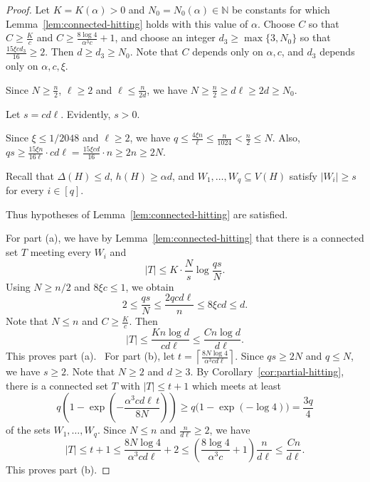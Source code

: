 \documentclass[11pt,a4paper]{article}
\theoremstyle{definition}
\theoremstyle{remark}
\newcommand{\N}{\mathbb N}
\begin{document}
\begin{proof}
Let $K=K(\alpha)>0$ and
$N_0=N_0(\alpha)\in\N$ be constants for which
Lemma~\ref{lem:connected-hitting} holds with this value of $\alpha$.
Choose $C$ so that
$C\ge \frac{K}{c}$ and $C\ge \frac{8\log4}{\alpha^3c}+1$, and choose an integer
$d_3\ge\max\{3,N_0\}$ so that $\frac{15\xi cd_3}{16}\ge2$. Then $d\ge d_3\ge N_0$. 
Note that $C$ depends only on $\alpha,c$, and $d_3$ depends only on
$\alpha,c,\xi$.


Since $N\ge \frac{n}{2}$, $\ell\ge2$ and $\ell\le \frac{n}{2d}$, we have
$N\ge \frac{n}{2}\ge d\ell\ge 2d\ge N_0$.


Let $s=cd\ell$. Evidently, $s>0$.

Since $\xi\le1/2048$ and $\ell\ge2$, we have $q\le \frac{4\xi n}{\ell}\le \frac{n}{1024}<\frac{n}{2}\le N$. Also, 
$qs\ge\frac{15\xi n}{16\ell}\cdot cd\ell
     =\frac{15\xi cd}{16}\cdot n
     \ge2n\ge2N$.

Recall that  $\Delta(H)\le d$,  $h(H)\ge\alpha d$, and 
$W_1,\ldots,W_q\subseteq V(H)$ satisfy $|W_i|\ge s$ for
every $i\in[q]$.

Thus hypotheses of Lemma~\ref{lem:connected-hitting} are satisfied.  


For part \textup{(a)}, we have by   Lemma~\ref{lem:connected-hitting} that there is  a connected set $T$
meeting every $W_i$ and 
\[
|T|\le K\cdot \frac{N}{s}\log \frac{qs}{N}.
\] 
Using $N\ge n/2$ and $8\xi c\le1$, we obtain
\[
 2\le\frac{qs}{N}
   \le\frac{2qcd\ell}{n}
   \le8\xi cd\le d.
\]
Note that  $N\le n$ and $C\ge \frac{K}{c}$. Then 
\[
 |T|\le\frac{Kn\log d}{cd\ell}
      \le\frac{Cn\log d}{d\ell}.
\]
This proves part (a).
\
For part (b), let
$t=\left\lceil \frac{8N\log4}{\alpha^3cd\ell}\right\rceil$.
Since $qs\ge 2N$ and $q\le N$, we have $s\ge 2$. 
Note that  $N\ge2$ and  $d\ge3$. By 
Corollary~\ref{cor:partial-hitting}, there is a connected set $T$ with $|T|\le t+1$ which meets  at least
\[
 q\left(1-\exp\left(-\frac{\alpha^3cd\ell\,t}{8N}\right)\right)
 \ge q\bigl(1-\exp(-\log4)\bigr)
 =\frac{3q}{4}
\]
of the sets $W_1,\dots, W_q$. Since $N\le n$ and $\frac{n}{d\ell}\ge2$, we have
\[
 |T|\le t+1
      \le\frac{8N\log4}{\alpha^3cd\ell}+2
      \le\left(\frac{8\log4}{\alpha^3c}+1\right)
             \frac{n}{d\ell}
      \le\frac{Cn}{d\ell}.
\]
This proves part \textup{(b)}.
\end{proof}
\end{document}
